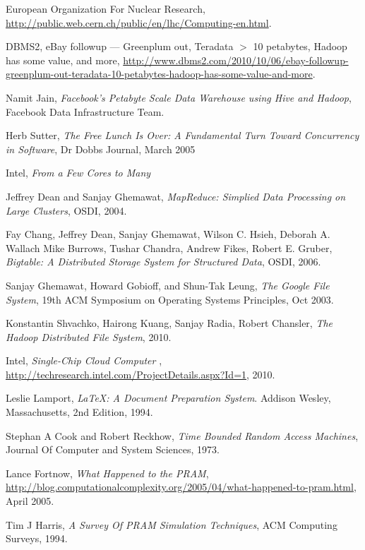 \documentclass{article}
\begin{document}
\begin{thebibliography}{9}

  European Organization For Nuclear Research, 
  \url{http://public.web.cern.ch/public/en/lhc/Computing-en.html}.
  
DBMS2, eBay followup — Greenplum out, Teradata $>$ 10 petabytes, Hadoop has some value, and more, \url{http://www.dbms2.com/2010/10/06/ebay-followup-greenplum-out-teradata-10-petabytes-hadoop-has-some-value-and-more}.

Namit Jain, \emph{Facebook’s Petabyte Scale Data Warehouse using Hive and Hadoop}, Facebook Data Infrastructure Team.

Herb Sutter, \emph{The Free Lunch Is Over: A Fundamental Turn Toward Concurrency in Software}, Dr Dobbs Journal, March 2005

Intel, \emph{From a Few Cores to Many}

Jeffrey Dean and Sanjay Ghemawat, \emph{MapReduce: Simplied Data Processing on Large Clusters}, OSDI, 2004.

Fay Chang, Jeffrey Dean, Sanjay Ghemawat, Wilson C. Hsieh, Deborah A. Wallach
Mike Burrows, Tushar Chandra, Andrew Fikes, Robert E. Gruber, \emph{Bigtable: A Distributed Storage System for Structured Data}, OSDI, 2006.

Sanjay Ghemawat, Howard Gobioff, and Shun-Tak Leung, \emph{The Google File System}, 19th ACM Symposium on Operating Systems Principles, Oct 2003.

Konstantin Shvachko, Hairong Kuang, Sanjay Radia, Robert Chansler, \emph{The Hadoop Distributed File System}, 2010.

Intel, \emph{	 Single-Chip Cloud Computer} , \url{http://techresearch.intel.com/ProjectDetails.aspx?Id=1}, 2010. 

  Leslie Lamport,
  \emph{\LaTeX: A Document Preparation System}.
  Addison Wesley, Massachusetts,
  2nd Edition,
  1994.

Stephan A Cook and Robert Reckhow, \emph{Time Bounded Random Access Machines}, Journal Of Computer and System Sciences, 1973. 

Lance Fortnow, \emph{What Happened to the PRAM}, \url{http://blog.computationalcomplexity.org/2005/04/what-happened-to-pram.html}, April 2005. 

Tim J Harris, \emph{A Survey Of PRAM Simulation Techniques}, ACM Computing Surveys, 1994. 


\end{thebibliography}
\end{document}
